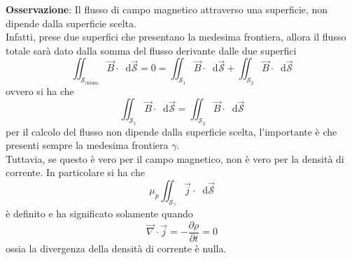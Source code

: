 \documentclass[a4paper]{extarticle}
\newcommand\dif{\mathop{}\!\mathrm{d}}
\begin{document}
\vspace{2em}
\noindent
\textbf{Osservazione}: Il flusso di campo magnetico attraverso una superficie, non dipende dalla superficie scelta.\\
Infatti, prese due superfici che presentano la medesima frontiera, allora il flusso totale sarà dato dalla somma del flusso derivante dalle due superfici
\[\iint_{\mathcal{S}_\text{chiusa}} \vec B \cdot \dif \vec{\mathcal{S}} = 0 = \iint_{\mathcal{S}_1} \vec B \cdot \dif \vec{\mathcal{S}} + \iint_{\mathcal{S}_2} \vec B \cdot \dif \vec{\mathcal{S}}\]
ovvero si ha che
\[\boxed{\iint_{\mathcal{S}_1} \vec B \cdot \dif \vec{\mathcal{S}} = \iint_{\mathcal{S}_2} \vec B \cdot \dif \vec{\mathcal{S}}}\]
per il calcolo del flusso non dipende dalla superficie scelta, l'importante è che presenti sempre la medesima frontiera $\gamma$.\\
Tuttavia, se questo è vero per il campo magnetico, non è vero per la densità di corrente. In particolare si ha che
\[\mu_p \iint_{{\mathcal{S}_\gamma}} \vec j \cdot \dif \vec{\mathcal{S}}\]
è definito e ha significato solamente quando
\[\vec \nabla \cdot \vec j = - \dfrac{\partial \rho}{\partial t} = 0\]
ossia la divergenza della densità di corrente è nulla.
\end{document}
